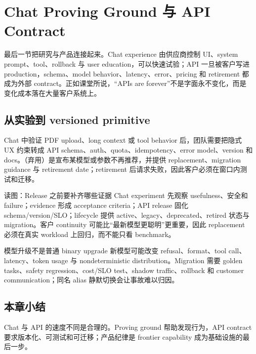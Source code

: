 \section{Chat Proving Ground 与 API Contract}

最后一节把研究与产品连接起来。Chat experience 由供应商控制 UI、system prompt、tool、rollback 与 user education，可以快速试验；API 一旦被客户写进 production，schema、model behavior、latency、error、pricing 和 retirement 都成为外部 contract。正如课堂所说，“APIs are forever”不是字面永不变化，而是变化成本落在大量客户系统上。

\subsection{从实验到 versioned primitive}

Chat 中验证 PDF upload、long context 或 tool behavior 后，团队需要把隐式 UX 约束转成 API schema、auth、quota、idempotency、error model、version 和 docs。（弃用）是宣布某模型或参数不再推荐，并提供 replacement、migration guidance 与 retirement date；retirement 后请求失败，因此客户必须在窗口内测试和迁移。


\begin{knowledgebox}{读图：Release 之前要补齐哪些证据}
Chat experiment 先观察 usefulness、安全和 failure；evidence 形成 acceptance criteria；API release 固化 schema/version/SLO；lifecycle 提供 active、legacy、deprecated、retired 状态与 migration。客户 continuity 可能比“最新模型更聪明”更重要，因此 replacement 必须在真实 workload 上回归，而不能只看 benchmark。
\end{knowledgebox}


\begin{warningbox}{模型升级不是普通 binary upgrade}
新模型可能改变 refusal、format、tool call、latency、token usage 与 nondeterministic distribution。Migration 需要 golden tasks、safety regression、cost/SLO test、shadow traffic、rollback 和 customer communication；同名 alias 静默切换会让事故难以归因。
\end{warningbox}

\subsection{本章小结}

Chat 与 API 的速度不同是合理的。Proving ground 帮助发现行为，API contract 要求版本化、可测试和可迁移；产品纪律是 frontier capability 成为基础设施的最后一步。

